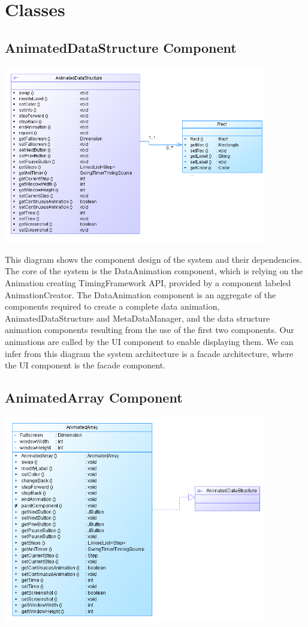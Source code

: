 \documentclass{l3proj}
\begin{document}
\section{Classes}
\subsection{AnimatedDataStructure Component}
\includegraphics[width=115mm]{images/animatedDataStructureDiagram.png}

This diagram shows the component design of the system and their dependencies. The core of the system is the DataAnimation component,
which is relying on the Animation creating TimingFramework API, provided by a component labeled AnimationCreator.
The DataAnimation component is an aggregate of the components required to create a complete data animation, AnimatedDataStructure and MetaDataManager, and the data structure animation components
resulting from the use of the first two components. Our animations are called by the UI component to enable displaying them.
We can infer from this diagram the system architecture is a facade architecture, where the UI component is the facade component.

\subsection{AnimatedArray Component}
\includegraphics[width=115mm]{images/arrayDiagram.png}
\end{document}
